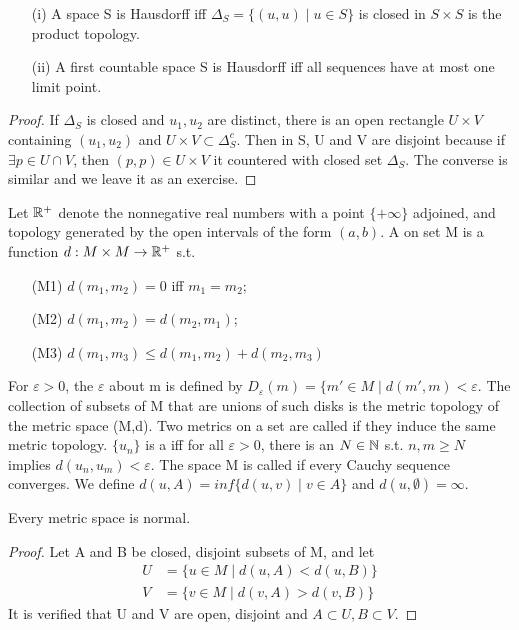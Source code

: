 \begin{prop}
\begin{enumerate}
\item[(i)] A space S is Hausdorff iff $\Delta_S=\lbrace(u,u)\mid u\in S\rbrace$ is closed in $S\times S$ is the product topology.
\item[(ii)] A first countable space S is Hausdorff iff all sequences have at most one limit point. 
\end{enumerate}
\end{prop}
\begin{proof}
If $\Delta_S$ is closed and $u_1,u_2$ are distinct, there is an open rectangle $U\times V$ containing $(u_1,u_2)$ and $U\times V
\subset \Delta_S^c$. Then in S, U and V are disjoint because if $\exists p\in U\cap V$, then $(p,p)\in U\times V$ it countered 
with closed set $\Delta_S$. The converse is similar and we leave it as an exercise.
\end{proof}
\begin{definition}
Let $\mathbb{R}^{+}$ denote the nonnegative real numbers with a point $\{+\infty\}$ adjoined, and topology generated by the open intervals
of the form $(a,b)$. A  on set M is a function $d:M\times M\rightarrow \mathbb{R}^{+}$ s.t.
\begin{enumerate}
\item[(M1)] $d(m_1,m_2)=0$ iff $m_1=m_2$;
\item[(M2)] $d(m_1,m_2)=d(m_2,m_1)$;
\item[(M3)] $d(m_1,m_3)\leq d(m_1,m_2)+d(m_2,m_3)$
\end{enumerate}
\end{definition}
For $\varepsilon > 0$, the $\varepsilon$  about m is defined by $D_\varepsilon(m)=\lbrace m'\in M\mid d(m',m)<\varepsilon$.
The collection of subsets of M that are unions of such disks is the metric topology of the metric space (M,d). Two metrics on a set
are called  if they induce the same metric topology. $\{u_n\}$ is a  iff for all $\varepsilon>0$,
there is an $N\in \mathbb{N}$ s.t. $n,m\geq N$ implies $d(u_n,u_m)<\varepsilon$. The space M is called  if every Cauchy sequence 
converges. We define $d(u,A)=inf\lbrace d(u,v)\mid v\in A \rbrace$ and $d(u,\emptyset)=\infty$.
\begin{prop}
Every metric space is normal.
\end{prop}
\begin{proof}
Let A and B be closed, disjoint subsets of M, and let 
\begin{align*}
U &= \lbrace u\in M\mid d(u,A)<d(u,B)\rbrace \\
V &= \lbrace v\in M\mid d(v,A)>d(v,B)\rbrace
\end{align*}
It is verified that U and V are open, disjoint and $A\subset U, B \subset V$.
\end{proof}
